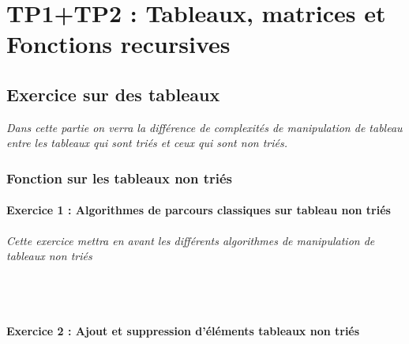 \chapter{TP1+TP2 : Tableaux, matrices et Fonctions recursives}

\section{Exercice sur des tableaux}
\textit{Dans cette partie on verra la différence de complexités de manipulation de tableau entre les tableaux qui sont triés et ceux qui sont non triés.}

\subsection{Fonction sur les tableaux non triés}

\subsubsection{Exercice 1 : Algorithmes de parcours classiques sur tableau non triés}
\textit{Cette exercice mettra en avant les différents algorithmes de manipulation de tableaux non triés}

\inputminted[linenos,firstline=7, lastline=14]{cpp}{../sources/cpp/TP1-2/manipTableauxNonTries.c}

\inputminted[linenos,firstline=16, lastline=18]{cpp}{../sources/cpp/TP1-2/manipTableauxNonTries.c}

\inputminted[linenos,firstline=20, lastline=28]{cpp}{../sources/cpp/TP1-2/manipTableauxNonTries.c}

\inputminted[linenos,firstline=30, lastline=37]{cpp}{../sources/cpp/TP1-2/manipTableauxNonTries.c}

\subsubsection{Exercice 2 : Ajout et suppression d'éléments tableaux non triés}

\inputminted[linenos,firstline=7, lastline=13]{cpp}{../sources/cpp/TP1-2/modifTableauxNonTries.c}

\inputminted[linenos,firstline=15, lastline=27]{cpp}{../sources/cpp/TP1-2/modifTableauxNonTries.c}

